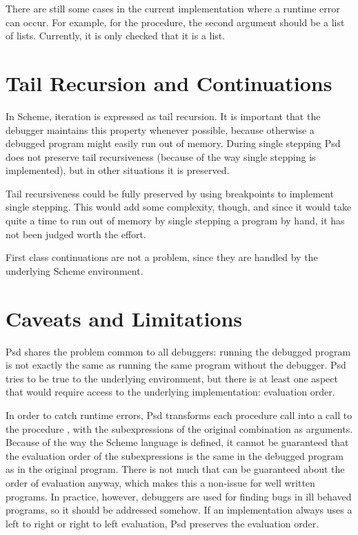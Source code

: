 There are still some cases in the current implementation where a
runtime error can occur. For example, for the 
procedure, the second argument should be a list of lists. Currently,
it is only checked that it is a list.


\section{Tail Recursion and Continuations}

In Scheme, iteration is expressed as tail recursion. It is important
that the debugger maintains this property whenever possible, because
otherwise a debugged program might easily run out of memory.  During
single stepping Psd does not preserve tail recursiveness (because of
the way single stepping is implemented), but in other situations it is
preserved.

Tail recursiveness could be fully preserved by using breakpoints to
implement single stepping. This would add some complexity, though, and
since it would take quite a time to run out of memory by single
stepping a program by hand, it has not been judged worth the effort.

First class continuations are not a problem, since they are handled by
the underlying Scheme environment.

\section{Caveats and Limitations}

Psd shares the problem common to all debuggers: running the debugged
program is not exactly the same as running the same program without
the debugger. Psd tries to be true to the underlying environment, but
there is at least one aspect that would require access to the
underlying implementation: evaluation order.

In order to catch runtime errors, Psd transforms each procedure call
into a call to the procedure , with the
subexpressions of the original combination as arguments. Because of
the way the Scheme language is defined, it cannot be guaranteed that the
evaluation order of the subexpressions is the same in the debugged
program as in the original program. There is not much that can be
guaranteed about the order of evaluation anyway, which makes this a
non-issue for well written programs. In practice, however, debuggers
are used for finding bugs in ill behaved programs, so it should be
addressed somehow. If an implementation always uses a left to right or
right to left evaluation, Psd preserves the evaluation order.

